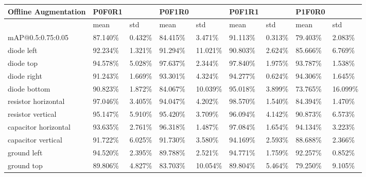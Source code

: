 \begin{table}[H]
\scriptsize %
\begin{center}
\begin{tabular}{|l|l|l|l|l|l|l|l|l|}
\hline
Offline Augmentation            & P0F0R1   &          & P0F1R0   &          & P0F1R1   &          & P1F0R0   &           \\
\hline
                                & mean     & std      & mean     & std      & mean     & std      & mean     & std       \\
\hline
mAP@0.5:0.75:0.05               & 87.140\% & 0.432\%  & 84.415\% & 3.471\%  & 91.113\% & 0.313\% & 79.403\% & 2.083\%    \\
\hline
\rowcolor{lightgray!50}
diode left                      & 92.234\% & 1.321\%  & 91.294\% & 11.021\% & 90.803\% & 2.624\% & 85.666\% & 6.769\%    \\
diode top                       & 94.578\% & 5.028\%  & 97.637\% & 2.344\%  & 97.840\% & 1.975\% & 93.787\% & 1.538\%    \\
\rowcolor{lightgray!50}
diode right                     & 91.243\% & 1.669\%  & 93.301\% & 4.324\%  & 94.277\% & 0.624\% & 94.306\% & 1.645\%    \\
diode bottom                    & 90.823\% & 1.872\%  & 84.067\% & 10.039\% & 95.018\% & 3.899\% & 73.765\% & 16.099\%   \\
\rowcolor{lightgray!50}
resistor horizontal             & 97.046\% & 3.405\%  & 94.047\% & 4.202\%  & 98.570\% & 1.540\% & 84.394\% & 1.470\%    \\
resistor vertical               & 95.147\% & 5.910\%  & 95.420\% & 3.709\%  & 96.094\% & 4.142\% & 90.873\% & 6.573\%    \\
\rowcolor{lightgray!50}
capacitor horizontal            & 93.635\% & 2.761\%  & 96.318\% & 1.487\%  & 97.084\% & 1.654\% & 94.134\% & 3.223\%    \\
capacitor vertical              & 91.722\% & 6.025\%  & 91.730\% & 3.580\%  & 94.169\% & 2.593\% & 88.688\% & 2.366\%    \\
\rowcolor{lightgray!50}
ground left                     & 94.520\% & 2.395\%  & 89.788\% & 2.521\%  & 94.771\% & 1.759\% & 92.257\% & 0.852\%    \\
ground top                      & 89.806\% & 4.827\%  & 83.703\% & 10.054\% & 89.804\% & 5.464\% & 79.250\% & 9.105\%    \\

\end{tabular}
\end{center}
\end{table}
